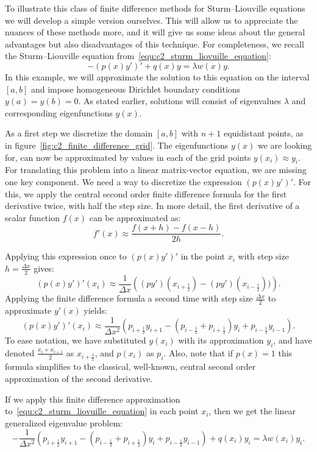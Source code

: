 To illustrate this class of finite difference methods for Sturm--Liouville equations we will develop a simple version ourselves. This will allow us to appreciate the nuances of these methods more, and it will give us some ideas about the general advantages but also disadvantages of this technique. For completeness, we recall the Sturm--Liouville equation from~\eqref{equ:c2_sturm_liovuille_equation}:
$$
    -(p(x)y')' + q(x) y = \lambda w(x) y\text{.}
$$
In this example, we will approximate the solution to this equation on the interval $[a, b]$ and impose homogeneous Dirichlet boundary conditions $y(a) = y(b) = 0$. As stated earlier, solutions will consist of eigenvalues $\lambda$ and corresponding eigenfunctions $y(x)$.

As a first step we discretize the domain $[a, b]$ with $n+1$ equidistant points, as in figure~\ref{fig:c2_finite_difference_grid}. The eigenfunctions $y(x)$ we are looking for, can now be approximated by values in each of the grid points $y(x_i) \approx y_i$. For translating this problem into a linear matrix-vector equation, we are missing one key component. We need a way to discretize the expression $(p(x) y')'$. For this, we apply the central second order finite difference formula for the first derivative twice, with half the step size. In more detail, the first derivative of a scalar function $f(x)$ can be approximated as:
$$
    f'(x) \approx \frac{f(x + h) - f(x - h)}{2h}\text{.}
$$

Applying this expression once to $(p(x) y')'$ in the point $x_i$ with step size $h = \frac{\Delta x}{2}$ gives:
$$
    (p(x) y')'(x_i) \approx \frac{1}{\Delta x}\left((p y')\left(x_{i+\frac{1}{2}}\right) - (p y')\left(x_{i-\frac{1}{2}}\right))\right)\text{.}
$$
Applying the finite difference formula a second time with step size $\frac{\Delta x}{2}$ to approximate $y'(x)$ yields:
$$
    (p(x) y')'(x_i) \approx \frac{1}{\Delta x^2}\left(p_{i+\frac{1}{2}} y_{i+1} - \left(p_{i-\frac{1}{2}} + p_{i+\frac{1}{2}}\right) y_i + p_{i-\frac{1}{2}} y_{i-1}\right)\text{.}
$$
To ease notation, we have substituted $y(x_i)$ with its approximation $y_i$, and have denoted $\frac{x_i + x_{i+1}}{2}$ as $x_{i+\frac{1}{2}}$, and $p(x_i)$ as $p_i$. Also, note that if $p(x) = 1$ this formula simplifies to the classical, well-known, central second order approximation of the second derivative.

If we apply this finite difference approximation to~\eqref{equ:c2_sturm_liovuille_equation} in each point $x_i$, then we get the linear generalized eigenvalue problem:
$$
    -\frac{1}{\Delta x^2}\left(p_{i+\frac{1}{2}} y_{i+1} - \left(p_{i-\frac{1}{2}} + p_{i+\frac{1}{2}}\right) y_i + p_{i-\frac{1}{2}} y_{i-1}\right) + q(x_i) y_i = \lambda w(x_i) y_i \text{.}
$$

